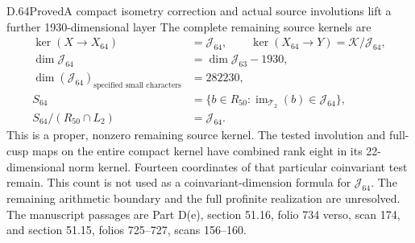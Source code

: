 \begin{statement}{D.64}{Proved}{A compact isometry correction and actual source involutions lift a further 1930-dimensional layer}
The complete remaining source kernels are
\[
 \begin{aligned}
 \ker(X\to X_{64})&=\mathcal J_{64},\qquad
 \ker(X_{64}\to Y)=\mathcal K/\mathcal J_{64},\\
 \dim\mathcal J_{64}&=\dim\mathcal J_{63}-1930,\\
 \dim(\mathcal J_{64})_{\text{specified small characters}}
                                      &=282230,\\
 S_{64}&=\{b\in R_{50}:
        \operatorname{im}_{\mathcal T_2}(b)\in\mathcal J_{64}\},\\
 S_{64}/(R_{50}\cap L_2)&=\mathcal J_{64}.
 \end{aligned}
 \tag{D.64.10}
\]
This is a proper, nonzero remaining source kernel.
The tested involution and full-cusp maps on the entire
compact kernel have combined rank eight in its
22-dimensional norm kernel. Fourteen coordinates of
that particular coinvariant test remain. This count
is not used as a coinvariant-dimension formula for
\(\mathcal J_{64}\). The remaining arithmetic boundary
and the full profinite realization are unresolved.
The manuscript passages are Part D(e), section 51.16,
folio 734 verso, scan 174, and section 51.15,
folios 725--727, scans 156--160.
\end{statement}
